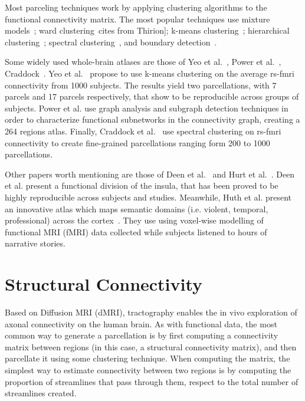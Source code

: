 Most parceling techniques work by applying clustering algorithms to the
functional connectivity matrix. The most popular techniques use 
mixture models~\cite{Lashkari2010, Ryali2012}; ward clustering~\cite{Blumensath2013}cites from Thirion];
k-means clustering~\cite{Yeo2011, Shen2013, Kahnt2012}; hierarchical clustering~\cite{Eickhoff2011, Michel2011};
spectral clustering~\cite{Thirion2006, Craddock2011, Schaefer2017}, and
boundary detection~\cite{Gordon2016, Wig2014, Schaefer2017}.

Some widely used whole-brain atlases are those of Yeo et al.~\cite{Yeo2011},
Power et al.~\cite{Power2011}, Craddock~\cite{Craddock2011}. 
Yeo et al.~\cite{Yeo2011} propose to use k-means clustering on the average
rs-fmri connectivity from 1000 subjects. The results yield two parcellations,
with 7 parcels and 17 parcels respectively, that show to be reproducible across
groups of subjects. Power et al.\cite{Power2011} use graph analysis and subgraph
detection techniques in order to characterize functional subnetworks in the
connectivity graph, creating a 264 regions atlas. Finally, Craddock et al.~\cite{Craddock2011}
use spectral clustering on rs-fmri connectivity to create fine-grained parcellations
ranging form 200 to 1000 parcellations.

Other papers worth mentioning are those of Deen et al.~\cite{Deen2011} and Hurt
et al.~\cite{Huth2016}. Deen et al.\cite{Deen2011} present a functional division
of the insula, that has been proved to be highly reproducible across subjects
and studies. Meanwhile, Huth et al. present an innovative atlas which maps semantic
domains (i.e. violent, temporal, professional) across the cortex~\cite{Huth2016}.
They use using voxel-wise modelling of functional MRI (fMRI) data collected while 
subjects listened to hours of narrative stories.


\section{Structural Connectivity}
\label{sec:structural}
Based on Diffusion MRI (dMRI), tractography enables the in vivo exploration of
axonal connectivity on the human brain. As with functional data, the most
common way to generate a parcellation is by first computing a connectivity matrix
between regions (in this case, a structural connectivity matrix), and then parcellate it using
some clustering technique. When computing the matrix, the simplest way to estimate
connectivity between two regions is by computing the proportion of streamlines
that pass through them, respect to the total number of streamlines created.

